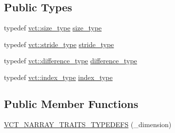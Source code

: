 \subsection*{Public Types}
\begin{DoxyCompactItemize}
\item 
typedef \hyperlink{namespacevct_a3e2935e13aac4500965e00d30565775b}{vct\-::size\-\_\-type} \hyperlink{classvct_dynamic_n_array_loop_engines_ab1f5ac52c9289b164e4ca3d37c9c857c}{size\-\_\-type}
\item 
typedef \hyperlink{namespacevct_ababd20afe3b060aa77ea229b0226c154}{vct\-::stride\-\_\-type} \hyperlink{classvct_dynamic_n_array_loop_engines_ae9b281249bae381156d7a354a06e7650}{stride\-\_\-type}
\item 
typedef \hyperlink{namespacevct_a1c68f426f63d011adc3563911c76550c}{vct\-::difference\-\_\-type} \hyperlink{classvct_dynamic_n_array_loop_engines_ae8d37731d603321cd52e0a6a6d13a017}{difference\-\_\-type}
\item 
typedef \hyperlink{namespacevct_a50405d87494dce1f22ee3930ca285ee9}{vct\-::index\-\_\-type} \hyperlink{classvct_dynamic_n_array_loop_engines_a072f02e39fa5ce2bfeb95aa4164ce813}{index\-\_\-type}
\end{DoxyCompactItemize}
\subsection*{Public Member Functions}
\begin{DoxyCompactItemize}
\item 
\hyperlink{classvct_dynamic_n_array_loop_engines_a6e465303126381f697946709c35d7c2c}{V\-C\-T\-\_\-\-N\-A\-R\-R\-A\-Y\-\_\-\-T\-R\-A\-I\-T\-S\-\_\-\-T\-Y\-P\-E\-D\-E\-F\-S} (\-\_\-dimension)
\end{DoxyCompactItemize}
